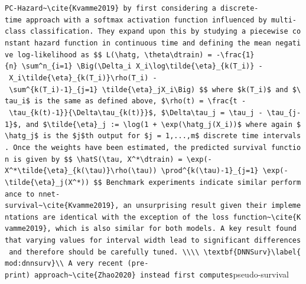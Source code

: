 \documentclass[
  letterpaper,
]{scrbook}
\theoremstyle{plain}
\theoremstyle{definition}
\theoremstyle{remark}
\begin{document}
\texttt{PC-Hazard\textquotesingle{}\textasciitilde{}\textbackslash{}cite\{Kvamme2019\}\ by\ first\ considering\ a\ discrete-time\ approach\ with\ a\ softmax\ activation\ function\ influenced\ by\ multi-class\ classification.\ They\ expand\ upon\ this\ by\ studying\ a\ piecewise\ constant\ hazard\ function\ in\ continuous\ time\ and\ defining\ the\ mean\ negative\ log-likelihood\ as\ \$\$\ L(\textbackslash{}hatg,\ \textbackslash{}theta\textbar{}\textbackslash{}dtrain)\ =\ -\textbackslash{}frac\{1\}\{n\}\ \textbackslash{}sum\^{}n\_\{i=1\}\ \textbackslash{}Big(\textbackslash{}Delta\_i\ X\_i\textbackslash{}log\textbackslash{}tilde\{\textbackslash{}eta\}\_\{k(T\_i)\}\ -\ X\_i\textbackslash{}tilde\{\textbackslash{}eta\}\_\{k(T\_i)\}\textbackslash{}rho(T\_i)\ -\ \textbackslash{}sum\^{}\{k(T\_i)-1\}\_\{j=1\}\ \textbackslash{}tilde\{\textbackslash{}eta\}\_jX\_i\textbackslash{}Big)\ \$\$\ where\ \$k(T\_i)\$\ and\ \$\textbackslash{}tau\_i\$\ is\ the\ same\ as\ defined\ above,\ \$\textbackslash{}rho(t)\ =\ \textbackslash{}frac\{t\ -\ \textbackslash{}tau\_\{k(t)-1\}\}\{\textbackslash{}Delta\textbackslash{}tau\_\{k(t)\}\}\$,\ \$\textbackslash{}Delta\textbackslash{}tau\_j\ =\ \textbackslash{}tau\_j\ -\ \textbackslash{}tau\_\{j-1\}\$,\ and\ \$\textbackslash{}tilde\{\textbackslash{}eta\}\_j\ :=\ \textbackslash{}log(1\ +\ \textbackslash{}exp(\textbackslash{}hatg\_j(X\_i))\$\ where\ again\ \$\textbackslash{}hatg\_j\$\ is\ the\ \$j\$th\ output\ for\ \$j\ =\ 1,...,m\$\ discrete\ time\ intervals.\ Once\ the\ weights\ have\ been\ estimated,\ the\ predicted\ survival\ function\ is\ given\ by\ \$\$\ \textbackslash{}hatS(\textbackslash{}tau,\ X\^{}*\textbar{}\textbackslash{}dtrain)\ =\ \textbackslash{}exp(-X\^{}*\textbackslash{}tilde\{\textbackslash{}eta\}\_\{k(\textbackslash{}tau)\}\textbackslash{}rho(\textbackslash{}tau))\ \textbackslash{}prod\^{}\{k(\textbackslash{}tau)-1\}\_\{j=1\}\ \textbackslash{}exp(-\textbackslash{}tilde\{\textbackslash{}eta\}\_j(X\^{}*))\ \$\$\ Benchmark\ experiments\ indicate\ similar\ performance\ to\ nnet-survival\textasciitilde{}\textbackslash{}cite\{Kvamme2019\},\ an\ unsurprising\ result\ given\ their\ implementations\ are\ identical\ with\ the\ exception\ of\ the\ loss\ function\textasciitilde{}\textbackslash{}cite\{Kvamme2019\},\ which\ is\ also\ similar\ for\ both\ models.\ A\ key\ result\ found\ that\ varying\ values\ for\ interval\ width\ lead\ to\ significant\ differences\ and\ therefore\ should\ be\ carefully\ tuned.\ \textbackslash{}\textbackslash{}\textbackslash{}\textbackslash{}\ \textbackslash{}textbf\{DNNSurv\}\textbackslash{}label\{mod:dnnsurv\}\textbackslash{}\textbackslash{}\ A\ very\ recent\ (pre-print)\ approach\textasciitilde{}\textbackslash{}cite\{Zhao2020\}\ instead\ first\ computes}pseudo-survival
\end{document}
